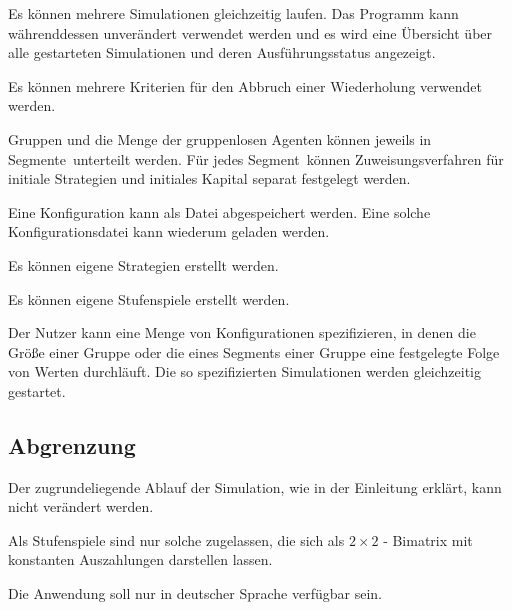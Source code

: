 \documentclass[parskip=full,11pt,twoside]{scrartcl}
\def\segment{Segment}
\def\segments{Segmente}
\begin{document}
Es können mehrere Simulationen gleichzeitig laufen. Das Programm kann währenddessen unverändert verwendet werden und es wird eine Übersicht über alle gestarteten Simulationen und deren Ausführungsstatus angezeigt.

Es können mehrere Kriterien für den Abbruch einer Wiederholung verwendet werden.

Gruppen und die Menge der gruppenlosen Agenten können jeweils in \segments\ unterteilt werden. Für jedes \segment\ können Zuweisungsverfahren für initiale Strategien und initiales Kapital separat festgelegt werden.

Eine Konfiguration kann als Datei abgespeichert werden. Eine solche Konfigurationsdatei kann wiederum geladen werden.

Es können eigene Strategien erstellt werden.

Es können eigene Stufenspiele erstellt werden.

Der Nutzer kann eine Menge von Konfigurationen spezifizieren, in denen die Größe einer Gruppe oder die eines \segment s einer Gruppe eine festgelegte Folge von Werten durchläuft. Die so spezifizierten Simulationen werden gleichzeitig gestartet.

\subsection{Abgrenzung}

Der zugrundeliegende Ablauf der Simulation, wie in der Einleitung erklärt, kann nicht verändert werden.

Als Stufenspiele sind nur solche zugelassen, die sich als \(2 \times 2\) - Bimatrix mit konstanten Auszahlungen darstellen lassen.

Die Anwendung soll nur in deutscher Sprache verfügbar sein.

\pagebreak

\end{document}
